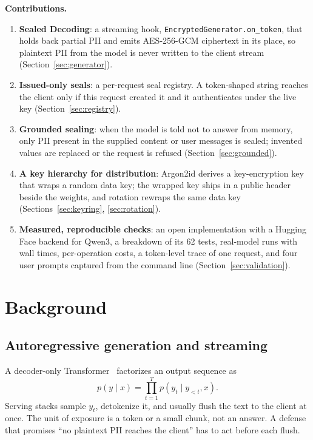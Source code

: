 \documentclass[conference,compsoc]{IEEEtran}
\newcommand{\code}[1]{\texttt{#1}}
\begin{document}
\textbf{Contributions.}
\begin{enumerate}
  \item \textbf{Sealed Decoding}: a streaming hook, \code{EncryptedGenerator.on\_token}, that holds back partial PII and emits AES-256-GCM ciphertext in its place, so plaintext PII from the model is never written to the client stream (Section~\ref{sec:generator}).
  \item \textbf{Issued-only seals}: a per-request seal registry. A token-shaped string reaches the client only if this request created it and it authenticates under the live key (Section~\ref{sec:registry}).
  \item \textbf{Grounded sealing}: when the model is told not to answer from memory, only PII present in the supplied content or user messages is sealed; invented values are replaced or the request is refused (Section~\ref{sec:grounded}).
  \item \textbf{A key hierarchy for distribution}: Argon2id derives a key-encryption key that wraps a random data key; the wrapped key ships in a public header beside the weights, and rotation rewraps the same data key (Sections~\ref{sec:keyring}, \ref{sec:rotation}).
  \item \textbf{Measured, reproducible checks}: an open implementation with a Hugging Face backend for Qwen3, a breakdown of its 62 tests, real-model runs with wall times, per-operation costs, a token-level trace of one request, and four user prompts captured from the command line (Section~\ref{sec:validation}).
\end{enumerate}

\section{Background}
\label{sec:background}

\subsection{Autoregressive generation and streaming}

A decoder-only Transformer~\cite{vaswani2017attention} factorizes an output sequence as
\begin{equation}
  p(y \mid x) = \prod_{t=1}^{T} p(y_t \mid y_{<t}, x).
  \label{eq:ar}
\end{equation}
Serving stacks sample $y_t$, detokenize it, and usually flush the text to the client at once. The unit of exposure is a token or a small chunk, not an answer. A defense that promises ``no plaintext PII reaches the client'' has to act before each flush.
\end{document}
